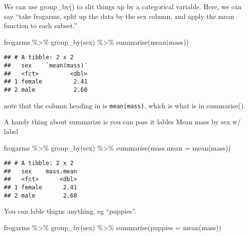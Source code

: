 \documentclass[
]{book}
\newenvironment{Shaded}{\begin{snugshade}}{\end{snugshade}}
\newcommand{\AttributeTok}[1]{\textcolor[rgb]{0.77,0.63,0.00}{#1}}
\newcommand{\FunctionTok}[1]{\textcolor[rgb]{0.00,0.00,0.00}{#1}}
\newcommand{\NormalTok}[1]{#1}
\newcommand{\SpecialCharTok}[1]{\textcolor[rgb]{0.00,0.00,0.00}{#1}}
\begin{document}
We can use group\_by() to slit things up by a categorical variable. Here, we can say ``take frogarms, split up the data by the sex column, and apply the mean function to each subset.''

\begin{Shaded}
\begin{Highlighting}[]
\NormalTok{frogarms }\SpecialCharTok{\%\textgreater{}\%} 
  \FunctionTok{group\_by}\NormalTok{(sex) }\SpecialCharTok{\%\textgreater{}\%}
  \FunctionTok{summarise}\NormalTok{(}\FunctionTok{mean}\NormalTok{(mass))}
\end{Highlighting}
\end{Shaded}

\begin{verbatim}
## # A tibble: 2 x 2
##   sex    `mean(mass)`
##   <fct>         <dbl>
## 1 female         2.41
## 2 male           2.60
\end{verbatim}

note that the column heading in is \texttt{mean(mass)}, which is what is in summarise().

A handy thing about summarize is you can pass it lables Mean mass by sex w/ label

\begin{Shaded}
\begin{Highlighting}[]
\NormalTok{frogarms }\SpecialCharTok{\%\textgreater{}\%} 
  \FunctionTok{group\_by}\NormalTok{(sex) }\SpecialCharTok{\%\textgreater{}\%}
  \FunctionTok{summarise}\NormalTok{(}\AttributeTok{mass.mean =} \FunctionTok{mean}\NormalTok{(mass))}
\end{Highlighting}
\end{Shaded}

\begin{verbatim}
## # A tibble: 2 x 2
##   sex    mass.mean
##   <fct>      <dbl>
## 1 female      2.41
## 2 male        2.60
\end{verbatim}

You can lable thigns anything, eg ``puppies''.

\begin{Shaded}
\begin{Highlighting}[]
\NormalTok{frogarms }\SpecialCharTok{\%\textgreater{}\%} 
  \FunctionTok{group\_by}\NormalTok{(sex) }\SpecialCharTok{\%\textgreater{}\%}
  \FunctionTok{summarise}\NormalTok{(}\AttributeTok{puppies =} \FunctionTok{mean}\NormalTok{(mass))}
\end{Highlighting}
\end{Shaded}
\end{document}
